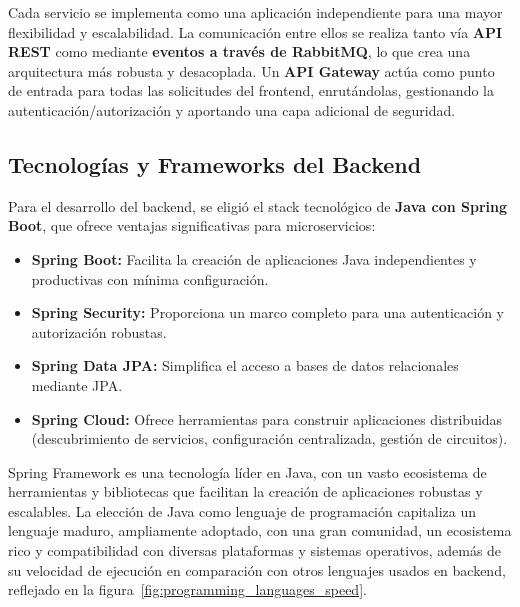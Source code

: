 Cada servicio se implementa como una aplicación independiente para una mayor flexibilidad y escalabilidad. La comunicación entre ellos se realiza tanto vía \textbf{API REST} como mediante \textbf{eventos a través de RabbitMQ}, lo que crea una arquitectura más robusta y desacoplada. Un \textbf{API Gateway} actúa como punto de entrada para todas las solicitudes del frontend, enrutándolas, gestionando la autenticación/autorización y aportando una capa adicional de seguridad.

\subsection{Tecnologías y Frameworks del Backend}

Para el desarrollo del backend, se eligió el stack tecnológico de \textbf{Java con Spring Boot}, que ofrece ventajas significativas para microservicios:

\begin{itemize}
    \item \textbf{Spring Boot:} Facilita la creación de aplicaciones Java independientes y productivas con mínima configuración.
    \item \textbf{Spring Security:} Proporciona un marco completo para una autenticación y autorización robustas.
    \item \textbf{Spring Data JPA:} Simplifica el acceso a bases de datos relacionales mediante JPA.
    \item \textbf{Spring Cloud:} Ofrece herramientas para construir aplicaciones distribuidas (descubrimiento de servicios, configuración centralizada, gestión de circuitos).
\end{itemize}

Spring Framework es una tecnología líder en Java, con un vasto ecosistema de herramientas y bibliotecas que facilitan la creación de aplicaciones robustas y escalables. La elección de Java como lenguaje de programación capitaliza un lenguaje maduro, ampliamente adoptado, con una gran comunidad, un ecosistema rico y compatibilidad con diversas plataformas y sistemas operativos, además de su velocidad de ejecución \cite{speed_comparison} en comparación con otros lenguajes usados en backend, reflejado en la figura~\ref{fig:programming_languages_speed}.


